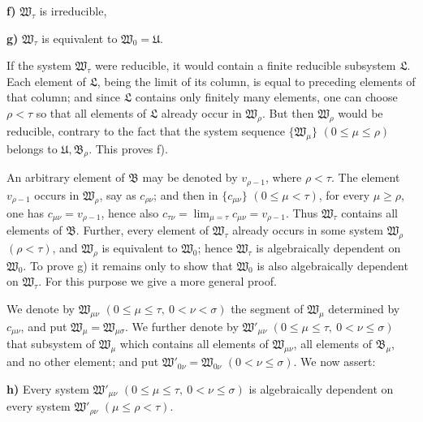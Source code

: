 \textbf{f)} \(\mathfrak W_\tau\) is irreducible,

\textbf{g)} \(\mathfrak W_\tau\) is equivalent to \(\mathfrak W_0=\mathfrak U\).

If the system \(\mathfrak W_\tau\) were reducible, it would contain a finite reducible subsystem \(\mathfrak L\). Each element of \(\mathfrak L\), being the limit of its column, is equal to preceding elements of that column; and since \(\mathfrak L\) contains only finitely many elements, one can choose \(\rho<\tau\) so that all elements of \(\mathfrak L\) already occur in \(\mathfrak W_\rho\). But then \(\mathfrak W_\rho\) would be reducible, contrary to the fact that the system sequence \(\{\mathfrak W_\mu\}\) \((0\leq\mu\leq\rho)\) belongs to \(\mathfrak U,\mathfrak B_\rho\). This proves f).

An arbitrary element of \(\mathfrak B\) may be denoted by \(v_{\rho-1}\), where \(\rho<\tau\). The element \(v_{\rho-1}\) occurs in \(\mathfrak W_\rho\), say as \(c_{\rho\nu}\); and then in \(\{c_{\mu\nu}\}\) \((0\leq\mu<\tau)\), for every \(\mu\geq\rho\), one has \(c_{\mu\nu}=v_{\rho-1}\), hence also \(c_{\tau\nu}=\lim_{\mu=\tau}c_{\mu\nu}=v_{\rho-1}\). Thus \(\mathfrak W_\tau\) contains all elements of \(\mathfrak B\). Further, every element of \(\mathfrak W_\tau\) already occurs in some system \(\mathfrak W_\rho\) \((\rho<\tau)\), and \(\mathfrak W_\rho\) is equivalent to \(\mathfrak W_0\); hence \(\mathfrak W_\tau\) is algebraically dependent on \(\mathfrak W_0\). To prove g) it remains only to show that \(\mathfrak W_0\) is also algebraically dependent on \(\mathfrak W_\tau\). For this purpose we give a more general proof.

We denote by \(\mathfrak W_{\mu\nu}\) \((0\leq\mu\leq\tau,\ 0<\nu<\sigma)\) the segment of \(\mathfrak W_\mu\) determined by \(c_{\mu\nu}\), and put \(\mathfrak W_\mu=\mathfrak W_{\mu\sigma}\). We further denote by \(\mathfrak W'_{\mu\nu}\) \((0\leq\mu\leq\tau,\ 0<\nu\leq\sigma)\) that subsystem of \(\mathfrak W_\mu\) which contains all elements of \(\mathfrak W_{\mu\nu}\), all elements of \(\mathfrak B_\mu\), and no other element; and put \(\mathfrak W'_{0\nu}=\mathfrak W_{0\nu}\) \((0<\nu\leq\sigma)\). We now assert:

\textbf{h)} Every system \(\mathfrak W'_{\mu\nu}\) \((0\leq\mu\leq\tau,\ 0<\nu\leq\sigma)\) is algebraically dependent on every system \(\mathfrak W'_{\rho\nu}\) \((\mu\leq\rho<\tau)\).

